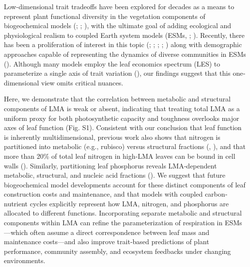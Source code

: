 \documentclass[
  12pt,
  letterpaper,
  DIV=11,
  numbers=noendperiod]{scrartcl}
\begin{document}
Low-dimensional trait tradeoffs have been explored for decades as a
means to represent plant functional diversity in the vegetation
components of biogeochemical models
(;
;
), with the ultimate
goal of adding ecological and physiological realism to coupled Earth
system models (ESMs, ;
). Recently,
there has been a proliferation of interest in this topic
(;
;
;
;
) along
with demographic approaches capable of representing the dynamics of
diverse communities in ESMs (). Although many models employ the leaf economics spectrum (LES) to
parameterize a single axis of trait variation
(), our findings suggest
that this one‐dimensional view omits critical nuances.

Here, we demonstrate that the correlation between metabolic and
structural components of LMA is weak or absent, indicating that treating
total LMA as a uniform proxy for both photosynthetic capacity and
toughness overlooks major axes of leaf function (Fig. S1). Consistent
with our conclusion that leaf function is inherently multidimensional,
previous work also shows that nitrogen is partitioned into metabolic
(e.g., rubisco) versus structural fractions
(,
), and that more than 20\% of total leaf
nitrogen in high‐LMA leaves can be bound in cell walls
(). Similarly, partitioning
leaf phosphorus reveals LMA‐dependent metabolic, structural, and nucleic
acid fractions ().
We suggest that future biogeochemical model developments account for
these distinct components of leaf construction costs and maintenance,
and that models with coupled carbon‐nutrient cycles explicitly represent
how LMA, nitrogen, and phosphorus are allocated to different functions.
Incorporating separate metabolic and structural components within LMA
can refine the parameterization of respiration in ESMs---which often
assume a direct correspondence between leaf mass and maintenance
costs---and also improve trait‐based predictions of plant performance,
community assembly, and ecosystem feedbacks under changing environments.
\end{document}
